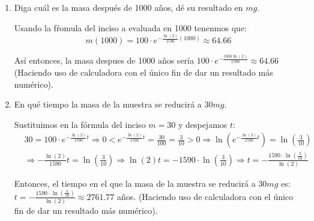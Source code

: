 \documentclass[12pt]{article}
\begin{document}
\begin{enumerate}[\hspace{9px} a)]
        Usando las propiedades de los logaritmos...
        \begin{equation*}
            \ln\left(e^{k\cdot1590}\right)=\ln\left(\frac{1}{2}\right) \Longrightarrow k\cdot1590 = \ln(2^{-1}) = -(1)\ln(2) \Longrightarrow k = -\frac{\ln(2)}{1590}
        \end{equation*}

        As\'i entonces nuestra f\'ormula para calcular la masa restante en funci\'on del tiempo es (Con t en años y m en mg):
        \[m(t)=100\cdot e^{-\frac{\ln(2)}{1590}t}\]

    \item Diga cuál es la masa después de 1000 años, dé su resultado en $mg$.\medskip
    
        Usando la f\'romula del inciso a evaluada en 1000 tenenmos que:
        \[m(1000)=100\cdot e^{-\frac{\ln(2)}{1590}(1000)}\approx64.66\]

        As\'i entonces, la masa despues de 1000 años ser\'ia \(100\cdot e^{-\frac{1000\ln(2)}{1590}}\approx64.66\) (Haciendo uso de calculadora con el \'unico fin de dar un resultado m\'as num\'erico).\medskip

    \item En qué tiempo la masa de la muestra se reducirá a $30mg$.\medskip
    
        Sustituimos en la f\'ormula del inciso \(m=30\) y despejamos $t$:
        \begin{align*}
            &30=100\cdot e^{-\frac{\ln(2)}{1590}t} \Longrightarrow 0<e^{-\frac{\ln(2)}{1590}t}=\frac{30}{100}=\frac{3}{10}>0\Longrightarrow \ln\left(e^{-\frac{\ln(2)}{1590}t}\right)=\ln\left(\frac{3}{10}\right)\\
            &\Longrightarrow -\frac{\ln(2)}{1590}t = \ln\left(\frac{3}{10}\right) \Longrightarrow \ln(2)t = -1590\cdot\ln\left(\frac{3}{10}\right) \Longrightarrow t = -\frac{1590\cdot\ln\left(\frac{3}{10}\right)}{\ln(2)}
        \end{align*}

        Entonces, el tiempo en el que la masa de la muestra se reducir\'a a \(30mg\) es:\quad \(t = -\frac{1590\cdot\ln\left(\frac{3}{10}\right)}{\ln(2)}\approx2761.77\) años. (Haciendo uso de calculadora con el \'unico fin de dar un resultado m\'as num\'erico).\medskip

\end{enumerate}
\end{document}
